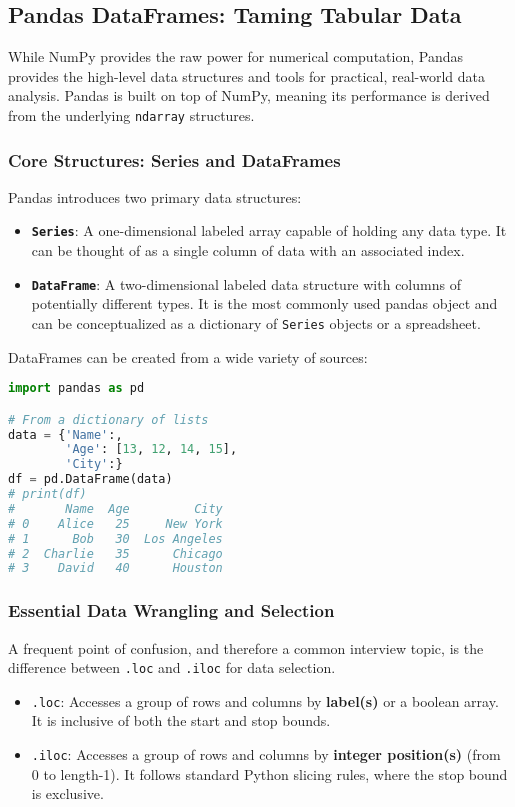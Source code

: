 \documentclass[11pt,a4paper]{article}
\begin{document}
\subsection{Pandas DataFrames: Taming Tabular Data}

While NumPy provides the raw power for numerical computation, Pandas provides the high-level data structures and tools for practical, real-world data analysis. Pandas is built on top of NumPy, meaning its performance is derived from the underlying \texttt{ndarray} structures.

\subsubsection{Core Structures: Series and DataFrames}

Pandas introduces two primary data structures:
\begin{itemize}
    \item \textbf{\texttt{Series}}: A one-dimensional labeled array capable of holding any data type. It can be thought of as a single column of data with an associated index.
    \item \textbf{\texttt{DataFrame}}: A two-dimensional labeled data structure with columns of potentially different types. It is the most commonly used pandas object and can be conceptualized as a dictionary of \texttt{Series} objects or a spreadsheet.
\end{itemize}

DataFrames can be created from a wide variety of sources:

\begin{lstlisting}[language=Python]
import pandas as pd

# From a dictionary of lists
data = {'Name':,
        'Age': [13, 12, 14, 15],
        'City':}
df = pd.DataFrame(data)
# print(df)
#       Name  Age         City
# 0    Alice   25     New York
# 1      Bob   30  Los Angeles
# 2  Charlie   35      Chicago
# 3    David   40      Houston
\end{lstlisting}

\subsubsection{Essential Data Wrangling and Selection}

A frequent point of confusion, and therefore a common interview topic, is the difference between \texttt{.loc} and \texttt{.iloc} for data selection.
\begin{itemize}
    \item \texttt{.loc}: Accesses a group of rows and columns by \textbf{label(s)} or a boolean array. It is inclusive of both the start and stop bounds.
    \item \texttt{.iloc}: Accesses a group of rows and columns by \textbf{integer position(s)} (from 0 to length-1). It follows standard Python slicing rules, where the stop bound is exclusive.
\end{itemize}
\end{document}
